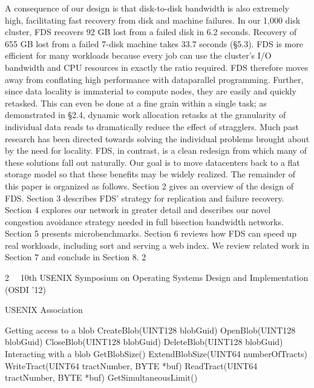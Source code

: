 A consequence of our design is that disk-to-disk bandwidth is also extremely high, facilitating fast recovery
from disk and machine failures. In our 1,000 disk cluster, FDS recovers 92 GB lost from a failed disk in 6.2
seconds. Recovery of 655 GB lost from a failed 7-disk
machine takes 33.7 seconds (§5.3).
FDS is more efficient for many workloads because every job can use the cluster’s I/O bandwidth and CPU
resources in exactly the ratio required. FDS therefore
moves away from conflating high performance with dataparallel programming. Further, since data locality is immaterial to compute nodes, they are easily and quickly
retasked. This can even be done at a fine grain within a
single task; as demonstrated in §2.4, dynamic work allocation retasks at the granularity of individual data reads
to dramatically reduce the effect of stragglers.
Much past research has been directed towards solving
the individual problems brought about by the need for
locality. FDS, in contrast, is a clean redesign from which
many of these solutions fall out naturally. Our goal is
to move datacenters back to a flat storage model so that
these benefits may be widely realized.
The remainder of this paper is organized as follows.
Section 2 gives an overview of the design of FDS. Section 3 describes FDS’ strategy for replication and failure
recovery. Section 4 explores our network in greater detail
and describes our novel congestion avoidance strategy
needed in full bisection bandwidth networks. Section 5
presents microbenchmarks. Section 6 reviews how FDS
can speed up real workloads, including sort and serving
a web index. We review related work in Section 7 and
conclude in Section 8.
2

2  10th USENIX Symposium on Operating Systems Design and Implementation (OSDI ’12)  

USENIX Association


Getting access to a blob
CreateBlob(UINT128 blobGuid)
OpenBlob(UINT128 blobGuid)
CloseBlob(UINT128 blobGuid)
DeleteBlob(UINT128 blobGuid)
Interacting with a blob
GetBlobSize()
ExtendBlobSize(UINT64 numberOfTracts)
WriteTract(UINT64 tractNumber, BYTE *buf)
ReadTract(UINT64 tractNumber, BYTE *buf)
GetSimultaneousLimit()

